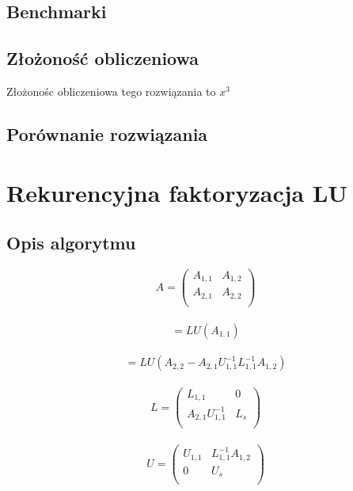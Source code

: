 \documentclass{article}
\begin{document}
\subsection{Benchmarki}
\subsection{Złożoność obliczeniowa}
Złożonośc obliczeniowa tego rozwiązania to $x^{3}$
\subsection{Porównanie rozwiązania}

\section{Rekurencyjna faktoryzacja LU}

\subsection{Opis algorytmu}

\begin{equation}
A = 
     \begin{pmatrix}
      A_{1,1} & A_{1,2}  \\
      A_{2,1} & A_{2,2} \\
     \end{pmatrix}
\end{equation}\\
\begin{equation}
[L_{1,1}, U_{1,1}] = LU(A_{1,1})
\end{equation}\\
\begin{equation}
[L_s, U_s]
= LU(A_{2,2} - A_{2,1}U_{1,1}^{-1}L_{1,1}^{-1}A_{1,2})
\end{equation}\\
\begin{equation}
L = 
    \begin{pmatrix}
        L_{1,1} & 0  \\         A_{2,1}U_{1,1}^{-1} & L_s \\
    \end{pmatrix}
\end{equation}\\
\begin{equation}
U = 
    \begin{pmatrix}
        U_{1,1} &  L_{1,1}^{-1}A_{1,2} \\         0 & U_s \\
    \end{pmatrix}
\end{equation}
\end{document}
